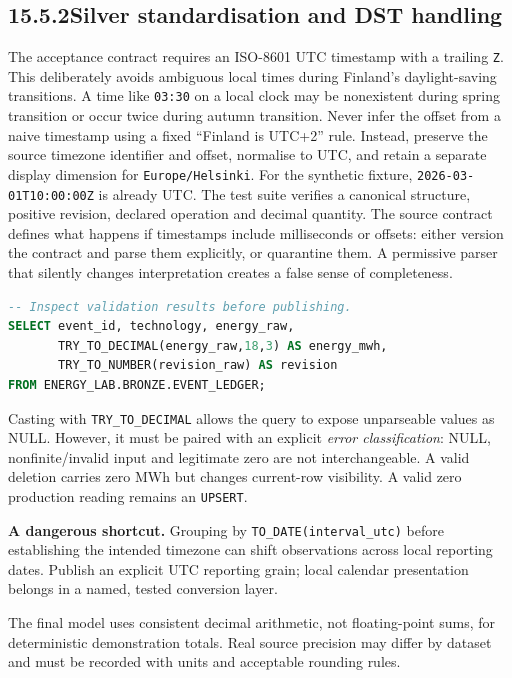 \documentclass[11pt,twoside]{article}
\newcommand{\topic}[2]{\subsection*{#1\quad #2}}
\begin{document}
\newpage

\topic{15.5.2}{Silver standardisation and DST handling}
The acceptance contract requires an ISO-8601 UTC timestamp with a trailing \texttt{Z}. This deliberately avoids ambiguous local times during Finland's daylight-saving transitions. A time like \texttt{03:30} on a local clock may be nonexistent during spring transition or occur twice during autumn transition. Never infer the offset from a naive timestamp using a fixed ``Finland is UTC+2'' rule. Instead, preserve the source timezone identifier and offset, normalise to UTC, and retain a separate display dimension for \texttt{Europe/Helsinki}.
For the synthetic fixture, \texttt{2026-03-01T10:00:00Z} is already UTC. The test suite verifies a canonical structure, positive revision, declared operation and decimal quantity. The source contract defines what happens if timestamps include milliseconds or offsets: either version the contract and parse them explicitly, or quarantine them. A permissive parser that silently changes interpretation creates a false sense of completeness.
\begin{lstlisting}[language=SQL]
-- Inspect validation results before publishing.
SELECT event_id, technology, energy_raw,
       TRY_TO_DECIMAL(energy_raw,18,3) AS energy_mwh,
       TRY_TO_NUMBER(revision_raw) AS revision
FROM ENERGY_LAB.BRONZE.EVENT_LEDGER;
\end{lstlisting}
Casting with \texttt{TRY\_TO\_DECIMAL} allows the query to expose unparseable values as NULL. However, it must be paired with an explicit \emph{error classification}: NULL, nonfinite/invalid input and legitimate zero are not interchangeable. A valid deletion carries zero MWh but changes current-row visibility. A valid zero production reading remains an \texttt{UPSERT}.
\begin{insight}\textbf{A dangerous shortcut.} Grouping by \texttt{TO\_DATE(interval\_utc)} before establishing the intended timezone can shift observations across local reporting dates. Publish an explicit UTC reporting grain; local calendar presentation belongs in a named, tested conversion layer.\end{insight}
The final model uses consistent decimal arithmetic, not floating-point sums, for deterministic demonstration totals. Real source precision may differ by dataset and must be recorded with units and acceptable rounding rules.

\newpage
\end{document}
